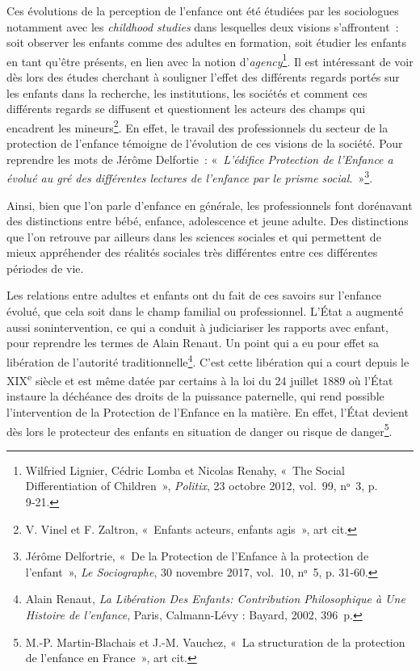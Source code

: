\documentclass[
  12,
  a4paper,
]{report}
\begin{document}
Ces évolutions de la perception de l'enfance ont été étudiées par les
sociologues notamment avec les \emph{childhood studies} dans lesquelles
deux visions s'affrontent~: soit observer les enfants comme des adultes
en formation, soit étudier les enfants en tant qu'être présents, en lien
avec la notion d'\emph{agency}\footnote{Wilfried Lignier, Cédric Lomba
  et Nicolas Renahy, {«~The Social Differentiation of Children~»},
  \emph{Politix}, 23 octobre 2012, vol.~99, nᵒ~3, p. 9‑21.}. Il est
intéressant de voir dès lors des études cherchant à souligner l'effet
des différents regards portés sur les enfants dans la recherche, les
institutions, les sociétés et comment ces différents regards se
diffusent et questionnent les acteurs des champs qui encadrent les
mineurs\footnote{V. Vinel et F. Zaltron, {«~Enfants acteurs, enfants
  agis~»}, art cit.}. En effet, le travail des professionnels du secteur
de la protection de l'enfance témoigne de l'évolution de ces visions de
la société. Pour reprendre les mots de Jérôme Delfortie~:
«~\emph{L'édifice Protection de l'Enfance a évolué au gré des
différentes lectures de l'enfance par le prisme social.}~»\footnote{Jérôme
  Delfortrie, {«~De la Protection de l'Enfance à la protection de
  l'enfant~»}, \emph{Le Sociographe}, 30 novembre 2017, vol.~10, nᵒ~5,
  p. 31‑60.}.

Ainsi, bien que l'on parle d'enfance en générale, les professionnels
font dorénavant des distinctions entre bébé, enfance, adolescence et
jeune adulte. Des distinctions que l'on retrouve par ailleurs dans les
sciences sociales et qui permettent de mieux appréhender des réalités
sociales très différentes entre ces différentes périodes de vie.

Les relations entre adultes et enfants ont du fait de ces savoirs sur
l'enfance évolué, que cela soit dans le champ familial ou professionnel.
L'État a augmenté aussi sonintervention, ce qui a conduit à judiciariser
les rapports avec enfant, pour reprendre les termes de Alain Renaut. Un
point qui a eu pour effet sa libération de l'autorité
traditionnelle\footnote{Alain Renaut, \emph{La Libération Des Enfants:
  Contribution Philosophique à Une Histoire de l'enfance}, {Paris},
  {Calmann-Lévy : Bayard}, 2002, 396~p.}. C'est cette libération qui a
court depuis le XIX\textsuperscript{e} siècle et est même datée par
certains à la loi du 24 juillet 1889 où l'État instaure la déchéance des
droits de la puissance paternelle, qui rend possible l'intervention de
la Protection de l'Enfance en la matière. En effet, l'État devient dès
lors le protecteur des enfants en situation de danger ou risque de
danger\footnote{M.-P. Martin-Blachais et J.-M. Vauchez, {«~La
  structuration de la protection de l'enfance en France~»}, art cit.}.
\end{document}
